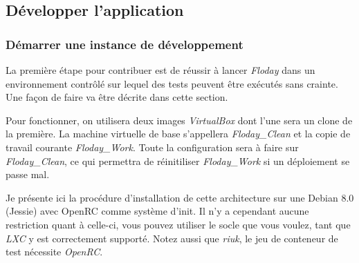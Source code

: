 \subsection{Développer l'application}
\subsubsection{Démarrer une instance de développement}

La première étape pour contribuer est de réussir à lancer \emph{Floday} dans un environnement contrôlé sur lequel des tests peuvent être exécutés sans crainte.
Une façon de faire va être décrite dans cette section.

Pour fonctionner, on utilisera deux images \emph{VirtualBox} dont l'une sera un clone de la première. La machine virtuelle de base s'appellera \emph{Floday\_Clean} et la copie de travail courante \emph{Floday\_Work}.
Toute la configuration sera à faire sur \emph{Floday\_Clean}, ce qui permettra de réinitiliser \emph{Floday\_Work} si un déploiement se passe mal.

Je présente ici la procédure d'installation de cette architecture sur une Debian 8.0 (Jessie) avec OpenRC comme système d'init.
Il n'y a cependant aucune restriction quant à celle-ci, vous pouvez utiliser le socle que vous voulez, tant que \emph{LXC} y est correctement supporté.
Notez aussi que \emph{riuk}, le jeu de conteneur de test nécessite \emph{OpenRC}.

